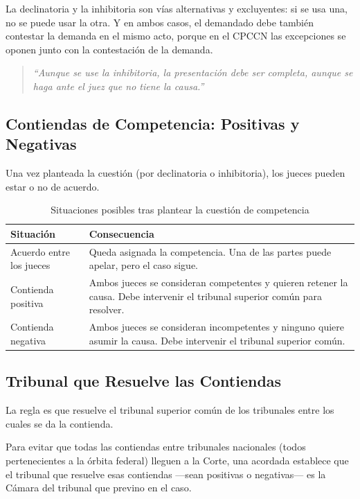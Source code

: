 \documentclass[12pt,oneside]{book}
\begin{document}
\begin{important}
La declinatoria y la inhibitoria son vías alternativas y excluyentes: si se usa una, no se puede usar la otra. Y en ambos casos, el demandado debe también contestar la demanda en el mismo acto, porque en el CPCCN las excepciones se oponen junto con la contestación de la demanda.
\end{important}

\begin{quote}
\itshape
``Aunque se use la inhibitoria, la presentación debe ser completa, aunque se haga ante el juez que no tiene la causa.''
\end{quote}

\subsection{Contiendas de Competencia: Positivas y Negativas}

Una vez planteada la cuestión (por declinatoria o inhibitoria), los jueces pueden estar o no de acuerdo.

\begin{table}[H]
\centering
\caption{Situaciones posibles tras plantear la cuestión de competencia}
\begin{tabularx}{\textwidth}{>{\raggedright\arraybackslash}p{} X}
\toprule
\textbf{Situación} & \textbf{Consecuencia} \\
\midrule
Acuerdo entre los jueces & Queda asignada la competencia. Una de las partes puede apelar, pero el caso sigue. \\
Contienda positiva & Ambos jueces se consideran competentes y quieren retener la causa. Debe intervenir el tribunal superior común para resolver. \\
Contienda negativa & Ambos jueces se consideran incompetentes y ninguno quiere asumir la causa. Debe intervenir el tribunal superior común. \\
\bottomrule
\end{tabularx}
\end{table}

\subsection{Tribunal que Resuelve las Contiendas}

La regla es que resuelve el tribunal superior común de los tribunales entre los cuales se da la contienda.

\begin{note}
Para evitar que todas las contiendas entre tribunales nacionales (todos pertenecientes a la órbita federal) lleguen a la Corte, una acordada establece que el tribunal que resuelve esas contiendas —sean positivas o negativas— es la Cámara del tribunal que previno en el caso.
\end{note}
\end{document}
